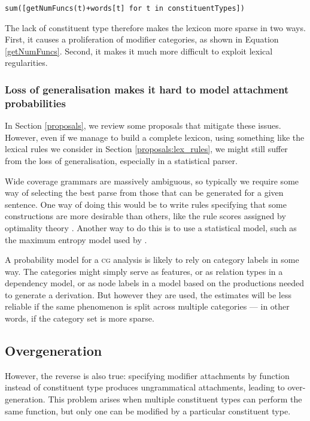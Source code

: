 \documentclass[11pt,twoside,final]{ahudson-harvard}
\newcommand{\cg}{\textsc{cg}\xspace}
\begin{document}
\begin{verbatim}
sum([getNumFuncs(t)+words[t] for t in constituentTypes])
\end{verbatim}

The lack of constituent type therefore makes the lexicon more sparse in two ways. First, it causes a proliferation of modifier categories, as shown in Equation \ref{getNumFuncs}. Second, it makes it much more difficult to exploit lexical regularities.

\subsubsection{Loss of generalisation makes it hard to model attachment probabilities}

In Section \ref{proposals}, we review some proposals that mitigate these issues. However, even if we manage to build a complete lexicon, using something like the lexical rules we consider in Section \ref{proposals:lex_rules}, we might still suffer from the loss of generalisation, especially in a statistical parser.

Wide coverage grammars are massively ambiguous, so typically we require some way of selecting the best parse from those that can be generated for a given sentence. One way of doing this would be to write rules specifying that some constructions are more desirable than others, like the rule scores assigned by optimality theory \citep{optimality_theory}. Another way to do this is to use a statistical model, such as the maximum entropy model used by \citet{clark:cl07}.

A probability model for a \cg analysis is likely to rely on category labels in some way. The categories might simply serve as features, or as relation types in a dependency model, or as node labels in a model based on the productions needed to generate a derivation. But however they are used, the estimates will be less reliable if the same phenomenon is split across multiple categories --- in other words, if the category set is more sparse.

\subsection{Overgeneration}

However, the reverse is also true: specifying modifier attachments by function instead of constituent type produces ungrammatical attachments, leading to over-generation. This problem arises when multiple constituent types can perform the same function, but only one can be modified by a particular constituent type.
\end{document}

